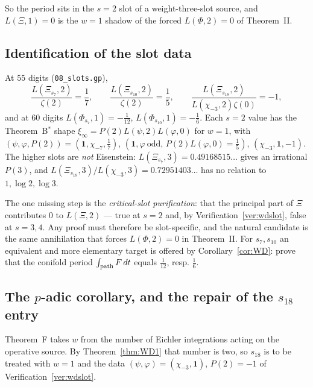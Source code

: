 So the period sits in the $s=2$ slot of a weight-three-slot source, and
$L(\Xi,1)=0$ is the $w=1$ shadow of the forced $L(\Phi,2)=0$ of Theorem~II.

\subsection{Identification of the slot data}

\begin{verification}\label{ver:wdslot}
At $55$ digits (\texttt{08\_slots.gp}),
\[
\frac{L(\Xi_{s_7},2)}{\zeta(2)}=\frac17,\qquad
\frac{L(\Xi_{s_{10}},2)}{\zeta(2)}=\frac15,\qquad
\frac{L(\Xi_{s_{18}},2)}{L(\chi_{-3},2)\zeta(0)}=-1,
\]
and at $60$ digits $L(\Phi_{s_7},1)=-\tfrac1{12}$, $L(\Phi_{s_{10}},1)=-\tfrac16$.
Each $s=2$ value has the Theorem~B$^*$ shape
$\xi_\infty=P(2)L(\psi,2)L(\varphi,0)$ for $w=1$, with
$(\psi,\varphi,P(2))=(\mathbf 1,\chi_{-7},\tfrac17)$,
$(\mathbf 1,\varphi\ \text{odd},\,P(2)L(\varphi,0)=\tfrac15)$,
$(\chi_{-3},\mathbf 1,-1)$.  The higher slots are \emph{not} Eisenstein:
$L(\Xi_{s_7},3)=0.49168515\ldots$ gives an irrational $P(3)$, and
$L(\Xi_{s_{18}},3)/L(\chi_{-3},3)=0.72951403\ldots$ has no relation to
$1,\log2,\log3$.
\end{verification}

\begin{remark}\label{rem:wdopen}
The one missing step is the \emph{critical-slot purification}: that the principal
part of $\Xi$ contributes $0$ to $L(\Xi,2)$ --- true at $s=2$ and, by
Verification~\ref{ver:wdslot}, false at $s=3,4$.  Any proof must therefore be
slot-specific, and the natural candidate is the same annihilation that forces
$L(\Phi,2)=0$ in Theorem~II.  For $s_7,s_{10}$ an equivalent and more elementary
target is offered by Corollary~\ref{cor:WD}: prove that the conifold period
$\int_{\rm path}F\,dt$ equals $\tfrac1{12}$, resp. $\tfrac16$. \Open
\end{remark}

\subsection{The $p$-adic corollary, and the repair of the $s_{18}$ entry}

Theorem~F takes $w$ from the number of Eichler integrations acting on the
operative source.  By Theorem~\ref{thm:WD1} that number is two, so $s_{18}$ is to
be treated with $w=1$ and the data $(\psi,\varphi)=(\chi_{-3},\mathbf 1)$,
$P(2)=-1$ of Verification~\ref{ver:wdslot}.

